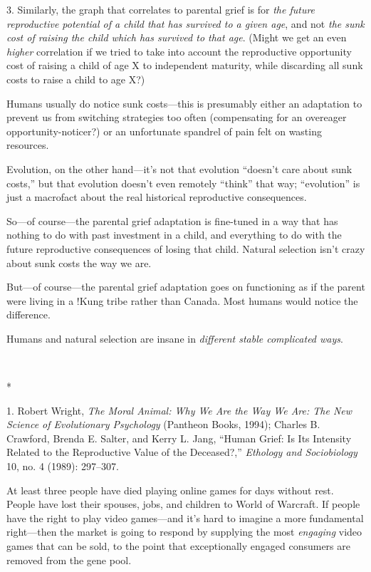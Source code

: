{
 3. Similarly, the graph that correlates to parental grief is for
\textit{the future reproductive potential of a child that has survived
to a given age}, and not \textit{the sunk cost of raising the child
which has survived to that age}. (Might we get an even \textit{higher}
correlation if we tried to take into account the reproductive
opportunity cost of raising a child of age X to independent maturity,
while discarding all sunk costs to raise a child to age X?)}

{
 Humans usually do notice sunk costs---this is presumably either an
adaptation to prevent us from switching strategies too often
(compensating for an overeager opportunity-noticer?) or an unfortunate
spandrel of pain felt on wasting resources.}

{
 Evolution, on the other hand---it's not that
evolution ``doesn't care about sunk
costs,'' but that evolution doesn't
even remotely ``think'' that way;
``evolution'' is just a macrofact
about the real historical reproductive consequences.}

{
 So---of course---the parental grief adaptation is fine-tuned in a
way that has nothing to do with past investment in a child, and
everything to do with the future reproductive consequences of losing
that child. Natural selection isn't crazy about sunk
costs the way we are.}

{
 But---of course---the parental grief adaptation goes on
functioning as if the parent were living in a !Kung tribe rather than
Canada. Most humans would notice the difference.}

{
 Humans and natural selection are insane in \textit{different
stable complicated ways}.}

{\centering
 \ ~
\par}

{\centering
 *
\par}


\bigskip

{
 1. Robert Wright, \textit{The Moral Animal: Why We Are the Way We
Are: The New Science of Evolutionary Psychology} (Pantheon Books,
1994); Charles B. Crawford, Brenda E. Salter, and Kerry L. Jang,
``Human Grief: Is Its Intensity Related to the
Reproductive Value of the Deceased?,''
\textit{Ethology and Sociobiology} 10, no. 4 (1989): 297--307.}


{
 At least three people have died playing online games for days
without rest. People have lost their spouses, jobs, and children to
World of Warcraft. If people have the right to play video games---and
it's hard to imagine a more fundamental right---then
the market is going to respond by supplying the most \textit{engaging}
video games that can be sold, to the point that exceptionally engaged
consumers are removed from the gene pool. }


